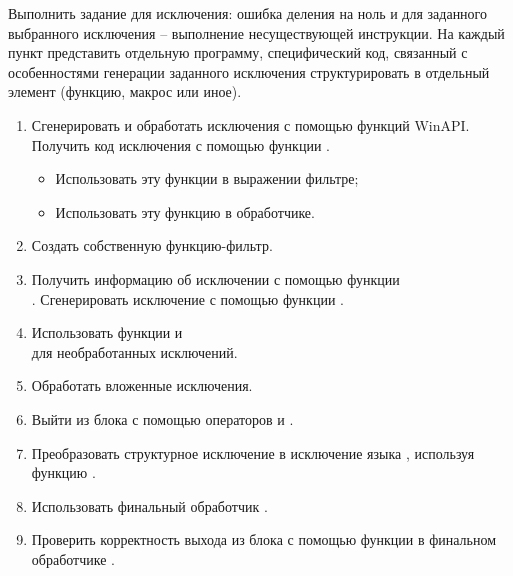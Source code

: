 \renewcommand{\labelenumii}{\theenumii}
\renewcommand{\theenumii}{\theenumi.\arabic{enumii}.}

Выполнить задание для исключения: ошибка деления на ноль и для заданного выбранного исключения -- выполнение несуществующей инструкции. На каждый пункт представить отдельную программу, специфический код, связанный с особенностями генерации заданного исключения структурировать в отдельный элемент (функцию, макрос или иное).

\begin{enumerate}
	\item Сгенерировать и обработать исключения с помощью функций WinAPI. Получить код исключения с помощью функции .
	\begin{itemize}
		\item Использовать эту функции в выражении фильтре;
		\item Использовать эту функцию в обработчике.
	\end{itemize}
	\item Создать собственную функцию-фильтр.
	\item Получить информацию об исключении с помощью функции \\ . Сгенерировать исключение с помощью функции .
	\item Использовать функции  и \\  для необработанных исключений.
	\item Обработать вложенные исключения.
	\item Выйти из блока  с помощью операторов  и .
	\item Преобразовать структурное исключение в исключение языка , используя функцию .
	\item Использовать финальный обработчик .
	\item Проверить корректность выхода из блока  с помощью функции  в финальном обработчике .
\end{enumerate}

